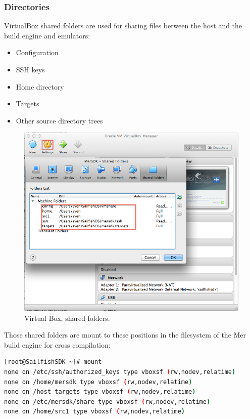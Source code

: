 \subsubsection{Directories}\label{subsubsec:mersdkdirectories}
%
VirtualBox shared folders are used for sharing files between the host and the build engine and emulators\cite{mer04}:
\begin{itemize}
\item Configuration
\item SSH keys
\item Home directory
\item Targets
\item Other source directory trees
\end{itemize}
%
\begin{figure}[H]
  \centering
  \includegraphics[scale=0.5]{../media/gfx/VirtualBox/vboxMerSettings02.png} 
  \caption{Virtual Box, shared folders.}
  \label{fig:vboxMerSettings02}
\end{figure}
%
Those shared folders are mount to these positions in the filesystem of the Mer build engine for cross compilation:
\begin{lstlisting}[language=bash]
[root@SailfishSDK ~]# mount
none on /etc/ssh/authorized_keys type vboxsf (rw,nodev,relatime)
none on /home/mersdk type vboxsf (rw,nodev,relatime)
none on /host_targets type vboxsf (rw,nodev,relatime)
none on /etc/mersdk/share type vboxsf (rw,nodev,relatime)
none on /home/src1 type vboxsf (rw,nodev,relatime)
\end{lstlisting}

